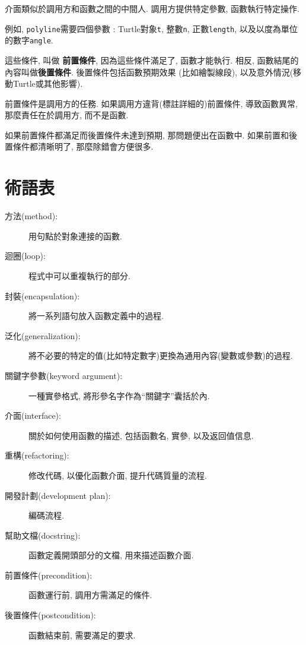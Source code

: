 \documentclass[10pt]{book}
\begin{document}
介面類似於調用方和函數之間的中間人. 
調用方提供特定參數, 函數執行特定操作. 

例如,  {\tt polyline}需要四個參數 : Turtle對象{\tt t},  整數{\tt n}, 
正數{\tt length},  以及以度為單位的數字{\tt angle}.

這些條件, 叫做 {\bf 前置條件},  因為這些條件滿足了, 函數才能執行. 
相反, 函數結尾的內容叫做{\bf 後置條件}. 後置條件包括函數預期效果
(比如繪製線段),  以及意外情況(移動Turtle或其他影響).

前置條件是調用方的任務. 如果調用方違背(標註詳細的)前置條件, 導致函數異常, 
那麼責任在於調用方, 而不是函數. 

如果前置條件都滿足而後置條件未達到預期, 那問題便出在函數中. 
如果前置和後置條件都清晰明了, 那麼除錯會方便很多. 

\section{術語表}

\begin{description}

\item[方法(method):] 用句點於對象連接的函數. 

\item[迴圈(loop):] 程式中可以重複執行的部分. 

\item[封裝(encapsulation):] 將一系列語句放入函數定義中的過程. 

\item[泛化(generalization):] 將不必要的特定的值(比如特定數字)更換為通用內容(變數或參數)的過程. 

\item[關鍵字參數(keyword argument):] 一種實參格式, 將形參名字作為``關鍵字''囊括於內. 

\item[介面(interface):] 關於如何使用函數的描述, 包括函數名, 實參, 以及返回值信息. 

\item[重構(refactoring):] 修改代碼, 以優化函數介面, 提升代碼質量的流程.

\item[開發計劃(development plan):] 編碼流程.

\item[幫助文檔(docstring):] 函數定義開頭部分的文檔, 用來描述函數介面. 

\item[前置條件(precondition):] 函數運行前, 調用方需滿足的條件. 

\item[後置條件(postcondition):] 函數結束前, 需要滿足的要求.

\end{description}
\end{document}
